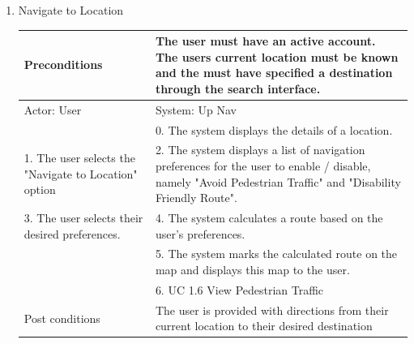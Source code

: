 \documentclass{article}
\begin{document}
\begin{enumerate}
\begin{center}
\begin{enumerate}
\begin{enumerate}
	\item{Navigate to Location}
	\begin{table}[H]
	\centering
		\begin{tabular}{ | p{15em} | p{15em}| }
		\hline 
		Preconditions                                                                                 						& The user must have an active account. The users current location must be known and the must have specified a destination through the search interface. \\ 
		\hline
		Actor: User                                                                                  						& System: Up Nav \\ 
		\hline
                                                                                             									& 0. The system displays the details of a location. \\ 
		\hline
		1. The user selects the "Navigate to Location" option                                        				& 2. The system displays a list of navigation preferences for the user to enable / disable, namely "Avoid Pedestrian Traffic" and "Disability Friendly Route". \\
		\hline
		3. The user selects their desired preferences.                                               				& 4. The system calculates a route based on the user's preferences. \\ 
		\hline
                                                                                            									& 5. The system marks the calculated route on the map and displays this map to the user. \\ 
		\hline
																	& 6. UC 1.6 View Pedestrian Traffic \\
		\hline
		Post conditions                                                                               						& The user is provided with directions from their current location to their desired destination \\ 
		\hline
		\end{tabular}
	\end{table}


\end{enumerate}
\end{enumerate}
\end{center}
\end{enumerate}
\end{document}
